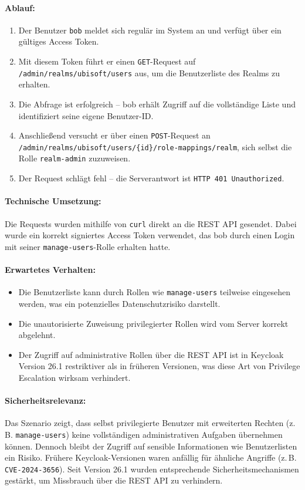 \documentclass[a4paper,12pt]{article}
\begin{document}
	\paragraph{Ablauf:}
	\begin{enumerate}
		\item Der Benutzer \texttt{bob} meldet sich regulär im System an und verfügt über ein gültiges Access Token.
		\item Mit diesem Token führt er einen \texttt{GET}-Request auf \texttt{/admin/realms/ubisoft/users} aus, um die Benutzerliste des Realms zu erhalten.
		\item Die Abfrage ist erfolgreich – bob erhält Zugriff auf die vollständige Liste und identifiziert seine eigene Benutzer-ID.
		\item Anschließend versucht er über einen \texttt{POST}-Request an \texttt{/admin/realms/ubisoft/users/\{id\}/role-mappings/realm}, sich selbst die Rolle \texttt{realm-admin} zuzuweisen.
		\item Der Request schlägt fehl – die Serverantwort ist \texttt{HTTP 401 Unauthorized}.
	\end{enumerate}
	
	\paragraph{Technische Umsetzung:}
	Die Requests wurden mithilfe von \texttt{curl} direkt an die REST API gesendet. Dabei wurde ein korrekt signiertes Access Token verwendet, das bob durch einen Login mit seiner \texttt{manage-users}-Rolle erhalten hatte.
	
	\paragraph{Erwartetes Verhalten:}
	\begin{itemize}
		\item Die Benutzerliste kann durch Rollen wie \texttt{manage-users} teilweise eingesehen werden, was ein potenzielles Datenschutzrisiko darstellt.
		\item Die unautorisierte Zuweisung privilegierter Rollen wird vom Server korrekt abgelehnt.
		\item Der Zugriff auf administrative Rollen über die REST API ist in Keycloak Version 26.1 restriktiver als in früheren Versionen, was diese Art von Privilege Escalation wirksam verhindert.
	\end{itemize}
	
	\paragraph{Sicherheitsrelevanz:}
	Das Szenario zeigt, dass selbst privilegierte Benutzer mit erweiterten Rechten (z.\,B. \texttt{manage-users}) keine vollständigen administrativen Aufgaben übernehmen können. Dennoch bleibt der Zugriff auf sensible Informationen wie Benutzerlisten ein Risiko. Frühere Keycloak-Versionen waren anfällig für ähnliche Angriffe (z.\,B. \texttt{CVE-2024-3656}). Seit Version 26.1 wurden entsprechende Sicherheitsmechanismen gestärkt, um Missbrauch über die REST API zu verhindern.
	
\end{document}
